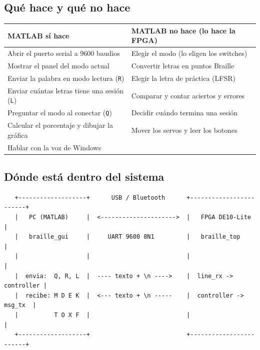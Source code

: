\documentclass[11pt,a4paper]{article}
\newcommand{\cod}[1]{\texttt{#1}}
\begin{document}
\subsection{Qué hace y qué no hace}
\begin{center}
\begin{tabularx}{\linewidth}{>{\raggedright}X >{\raggedright\arraybackslash}X}
\toprule
\textbf{MATLAB sí hace} & \textbf{MATLAB no hace (lo hace la FPGA)} \\
\midrule
Abrir el puerto serial a 9600 baudios & Elegir el modo (lo eligen los switches) \\
Mostrar el panel del modo actual & Convertir letras en puntos Braille \\
Enviar la palabra en modo lectura (\cod{R}) & Elegir la letra de práctica (LFSR) \\
Enviar cuántas letras tiene una sesión (\cod{L}) & Comparar y contar aciertos y errores \\
Preguntar el modo al conectar (\cod{Q}) & Decidir cuándo termina una sesión \\
Calcular el porcentaje y dibujar la gráfica & Mover los servos y leer los botones \\
Hablar con la voz de Windows & \\
\bottomrule
\end{tabularx}
\end{center}

\subsection{Dónde está dentro del sistema}
\begin{diagrama}
\begin{verbatim}
   +-------------------+      USB / Bluetooth      +------------------------+
   |   PC (MATLAB)     |  <--------------------->  |   FPGA DE10-Lite       |
   |   braille_gui     |     UART 9600 8N1         |   braille_top          |
   |                   |                           |                        |
   |  envia:  Q, R, L  |  ---- texto + \n ---->    |  line_rx -> controller |
   |  recibe: M D E K  |  <--- texto + \n -----    |  controller -> msg_tx  |
   |          T O X F  |                           |                        |
   +-------------------+                           +------------------------+
\end{verbatim}
\end{diagrama}
\end{document}
